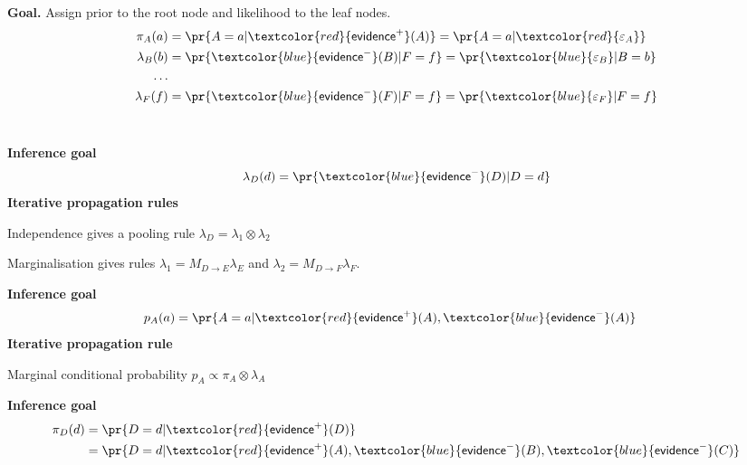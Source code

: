 \documentclass[landscape,footrule]{foils}
\newcommand{\EVPOS}{\textcolor{red}{\mathsf{evidence}^+}}
\newcommand{\EVNEG}{\textcolor{blue}{\mathsf{evidence}^-}}
\begin{document}
\enlargethispage{1cm}
\vspace*{-0.5cm}
\textbf{Goal.} Assign prior to the root node and likelihood to the leaf nodes.
\begin{align*}
\pi_A(a)&=\pr{A=a|\EVPOS(A)}=\pr{A=a|\textcolor{red}{\varepsilon_A}}\\
\lambda_B(b)&=\pr{\EVNEG(B)|F=f}=\pr{\textcolor{blue}{\varepsilon_B}|B=b}\\
\ldots\\
\lambda_F(f)&=\pr{\EVNEG(F)|F=f}=\pr{\textcolor{blue}{\varepsilon_F}|F=f}
\end{align*}\vspace*{-4ex}\





\vspace*{-1.0cm}
\textbf{Inference goal}
\begin{align*}
\lambda_D(d)=\pr{\EVNEG(D)|D=d}
\end{align*}
\textbf{Iterative propagation rules}
\begin{triangles}
\item Independence gives a pooling rule $\lambda_D=\lambda_1\otimes\lambda_2$
\item Marginalisation gives rules $\lambda_1= M_{D\to E}\lambda_E$ and $\lambda_2= M_{D\to F}\lambda_F$.
\end{triangles}


\vspace*{-0.5cm}

\textbf{Inference goal}
\begin{align*}
p_A(a)&=\pr{A=a|\EVPOS(A),\EVNEG(A)}
\end{align*}
\textbf{Iterative propagation rule}
\begin{triangles}
\item Marginal conditional probability $p_A\propto \pi_A\otimes\lambda_A$\vspace*{-1ex}
\end{triangles}


\enlargethispage{1cm}
\vspace*{-1.5cm}
\textbf{Inference goal}
\begin{align*}
\pi_D(d)&=\pr{D=d|\EVPOS(D)}\\
&=\pr{D=d|\EVPOS(A),\EVNEG(B),\EVNEG(C)}
\end{align*}\vspace*{-4ex}
\end{document}
